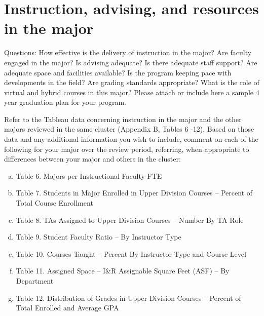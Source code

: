 \documentclass[12pt]{article}
\begin{document}
\section{Instruction, advising, and resources in the major}
{\color{red} Questions: How effective is the delivery of instruction in the major? Are faculty engaged in the major? Is advising adequate? Is there adequate staff support? Are adequate space and facilities available? Is the program keeping pace with developments in the field? Are grading standards appropriate? What is the role of virtual and hybrid courses in this major? Please attach or include here a sample 4 year graduation plan for your program.}

Refer to the Tableau data concerning instruction in the major and the other majors reviewed in the same cluster (Appendix B, Tables 6 -12). Based on those data and any additional information you wish to include, comment on each of the following for your major over the review period, referring, when appropriate to differences between your major and others in the cluster:
\begin{enumerate}[a)]
 \item Table 6.  Majors per Instructional Faculty FTE
 \item Table 7.  Students in Major Enrolled in Upper Division Courses – Percent of Total Course Enrollment 
 \item Table 8.  TAs Assigned to Upper Division Courses – Number By TA Role 
 \item Table 9.  Student Faculty Ratio – By Instructor Type 
 \item Table 10.  Courses Taught – Percent By Instructor Type and Course Level 
 \item Table 11.  Assigned Space – I\&R Assignable Square Feet (ASF) – By Department
 \item Table 12.  Distribution of Grades in Upper Division Courses – Percent of Total Enrolled and Average GPA 
\end{enumerate}
   
\end{document}
